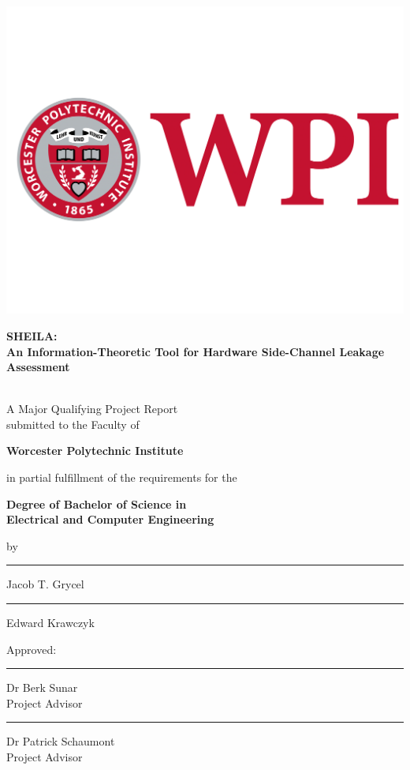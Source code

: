 
\thispagestyle{fancy}
\setlength{\headheight}{14.5pt}
\renewcommand{\headrulewidth}{0pt}
\cfoot{}



\begin{center}
    \centering
    {\includegraphics[width=0.3\linewidth]{../figures/misc/wpi-logo/wpi-logo.png}\par}
    {\LARGE \textbf{SHEILA: \\An Information-Theoretic Tool for Hardware Side-Channel Leakage Assessment}\\~\\\par}
    \vfill
    {\normalsize A Major Qualifying Project Report\\
    submitted to the Faculty of\par}
    \vfill
    {\large \textbf{Worcester Polytechnic Institute}\par}
    \vfill
    {\normalsize in partial fulfillment of the requirements for the\par}
    \vfill
    {\large \textbf{Degree of Bachelor of Science in\\
    Electrical and Computer Engineering}\par}
    \vfill
    {\normalsize by\par}
    \vfill
    \begin{multicols}{2}
      {\rule{0.7\linewidth}{0.5pt}\par}
      {\large Jacob T. Grycel}
      \vfill
      {\rule{0.7\linewidth}{0.5pt}\par}
      {\large Edward Krawczyk\par}
    \end{multicols}
    \vfill
    {\normalsize Approved:\par}
    \vfill
    \begin{multicols}{2}
      {\rule{0.7\linewidth}{0.5pt}\par}
      {\large Dr Berk Sunar\\\normalsize Project Advisor\par}
      \vfill
      {\rule{0.7\linewidth}{0.5pt}\par}
      {\large Dr Patrick Schaumont\\\normalsize Project Advisor\par}
    \end{multicols}
\end{center}